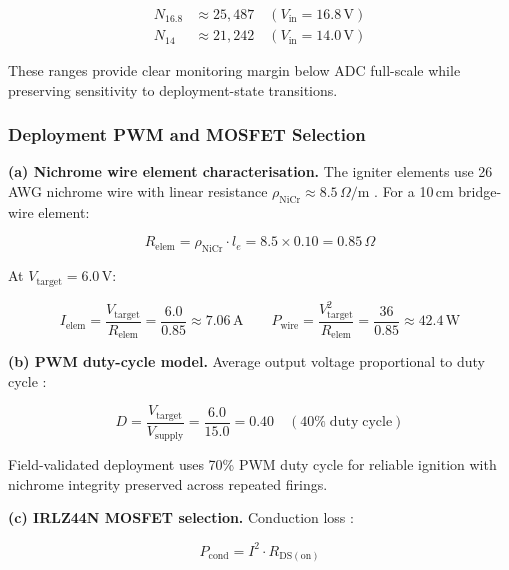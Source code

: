\begin{align}
  N_{16.8} &\approx 25{,}487 \quad (V_\mathrm{in} = 16.8\,\mathrm{V})\\
  N_{14}   &\approx 21{,}242 \quad (V_\mathrm{in} = 14.0\,\mathrm{V})
  \label{eq:adc_codes}
\end{align}

These ranges provide clear monitoring margin below ADC full-scale while
preserving sensitivity to deployment-state transitions.

\subsubsection{Deployment PWM and MOSFET Selection}
\label{sec:pwm_calc}

\noindent\textbf{(a) Nichrome wire element characterisation.}
The igniter elements use 26\,AWG nichrome wire with linear resistance
$\rho_\mathrm{NiCr} \approx 8.5\,\Omega/\mathrm{m}$ \cite{nichrome_ignition}.
For a 10\,cm bridge-wire element:

\begin{equation}
  R_\mathrm{elem} = \rho_\mathrm{NiCr} \cdot l_e = 8.5 \times 0.10 = 0.85\,\Omega
\end{equation}

At $V_\mathrm{target} = 6.0$\,V:

\begin{equation}
  I_\mathrm{elem} = \frac{V_\mathrm{target}}{R_\mathrm{elem}} = \frac{6.0}{0.85} \approx 7.06\,\mathrm{A}
  \qquad
  P_\mathrm{wire} = \frac{V_\mathrm{target}^2}{R_\mathrm{elem}} = \frac{36}{0.85} \approx 42.4\,\mathrm{W}
\end{equation}

\noindent\textbf{(b) PWM duty-cycle model.}
Average output voltage proportional to duty cycle \cite{pwm_heating,barr_pwm}:

\begin{equation}
  D = \frac{V_\mathrm{target}}{V_\mathrm{supply}} = \frac{6.0}{15.0} = 0.40
  \quad (40\%\;\mathrm{duty\;cycle})
\end{equation}

Field-validated deployment uses 70\% PWM duty cycle for reliable ignition with
nichrome integrity preserved across repeated firings.

\noindent\textbf{(c) IRLZ44N MOSFET selection.}
Conduction loss \cite{irlz44n_datasheet}:

\begin{equation}
  P_\mathrm{cond} = I^2 \cdot R_\mathrm{DS(on)}
\end{equation}

